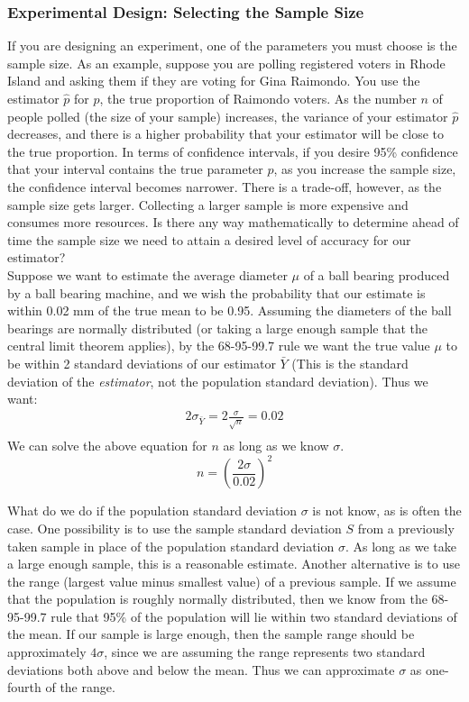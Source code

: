 \documentclass[notes.tex]{subfiles}
\begin{document}
\subsubsection{Experimental Design: Selecting the Sample Size}
If you are designing an experiment, one of the parameters you must choose is the sample size. As an example, suppose you are polling registered voters in Rhode Island and asking them if they are voting for Gina Raimondo. You use the estimator $\hat{p}$ for $p$, the true proportion of Raimondo voters. As the number $n$ of people polled (the size of your sample) increases, the variance of your estimator $\hat{p}$ decreases, and there is a higher probability that your estimator will be close to the true proportion. In terms of confidence intervals, if you desire 95\% confidence that your interval contains the true parameter $p$, as you increase the sample size, the confidence interval becomes narrower. There is a trade-off, however, as the sample size gets larger. Collecting a larger sample is more expensive and consumes more resources. Is there any way mathematically to determine ahead of time the sample size we need to attain a desired level of accuracy for our estimator?\\

Suppose we want to estimate the average diameter $\mu$ of a ball bearing produced by a ball bearing machine, and we wish the probability that our estimate is within 0.02 mm of the true mean to be 0.95. Assuming the diameters of the ball bearings are normally distributed (or taking a large enough sample that the central limit theorem applies), by the 68-95-99.7 rule we want the true value $\mu$ to be within 2 standard deviations of our estimator $\bar{Y}$ (This is the standard deviation of the \emph{estimator}, not the population standard deviation). Thus we want:
\begin{align*}
2 \sigma_{\bar{Y}} = 2 \frac{\sigma}{\sqrt{n}} = 0.02 \\
\end{align*}
We can solve the above equation for $n$ as long as we know $\sigma$.
\[
n = \left( \frac{2 \sigma}{0.02}\right)^2
\]

What do we do if the population standard deviation $\sigma$ is not know, as is often the case. One possibility is to use the sample standard deviation $S$ from a previously taken sample in place of the population standard deviation $\sigma$. As long as we take a large enough sample, this is a reasonable estimate. Another alternative is to use the range (largest value minus smallest value) of a previous sample. If we assume that the population is roughly normally distributed, then we know from the 68-95-99.7 rule that 95\% of the population will lie within two standard deviations of the mean. If our sample is large enough, then the sample range should be approximately $4\sigma$, since we are assuming the range represents two standard deviations both above and below the mean. Thus we can approximate $\sigma$ as one-fourth of the range.\\
\end{document}
